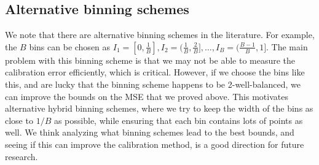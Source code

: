 \subsection{Alternative binning schemes}

We note that there are alternative binning schemes in the literature.
For example, the $B$ bins can be chosen as $I_1 = [0, \frac{1}{B}], I_2 = (\frac{1}{B}, \frac{2}{B}], \dots, I_B = (\frac{B-1}{B}, 1]$.
The main problem with this binning scheme is that we may not be able to measure the calibration error efficiently, which is critical.
However, if we choose the bins like this, and are lucky that the binning scheme happens to be 2-well-balanced, we can improve the bounds on the MSE that we proved above.
This motivates alternative hybrid binning schemes, where we try to keep the width of the bins as close to $1/B$ as possible, while ensuring that each bin contains lots of points as well.
We think analyzing what binning schemes lead to the best bounds, and seeing if this can improve the calibration method, is a good direction for future research.

